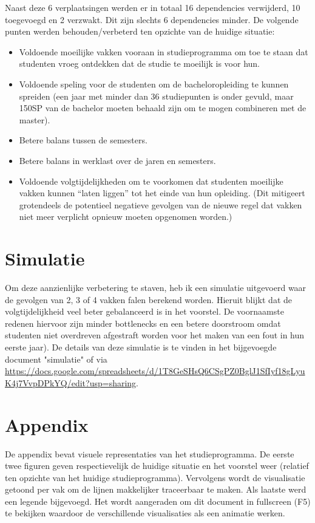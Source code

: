 \documentclass[a4paper]{article}
\begin{document}
    Naast deze 6 verplaatsingen werden er in totaal 16 dependencies verwijderd, 10 toegevoegd en 2 verzwakt. Dit zijn slechts 6 dependencies minder. De volgende punten werden behouden/verbeterd ten opzichte van de huidige situatie:
    \begin{itemize}
        \item Voldoende moeilijke vakken vooraan in studieprogramma om toe te staan dat studenten vroeg ontdekken dat de studie te moeilijk is voor hun.
        \item Voldoende speling voor de studenten om de bacheloropleiding te kunnen spreiden (een jaar met minder dan 36 studiepunten is onder gevuld, maar 150SP van de bachelor moeten behaald zijn om te mogen combineren met de master).
        \item Betere balans tussen de semesters.
        \item Betere balans in werklast over de jaren en semesters.
        \item Voldoende volgtijdelijkheden om te voorkomen dat studenten moeilijke vakken kunnen “laten liggen” tot het einde van hun opleiding. (Dit mitigeert grotendeels de potentieel negatieve gevolgen van de nieuwe regel dat vakken niet meer verplicht opnieuw moeten opgenomen worden.)
    \end{itemize}

    \section{Simulatie}
    \label{sec:simulatie}

    Om deze aanzienlijke verbetering te staven, heb ik een simulatie uitgevoerd waar de gevolgen van 2, 3 of 4 vakken falen berekend worden. Hieruit blijkt dat de volgtijdelijkheid veel beter gebalanceerd is in het voorstel. De voornaamste redenen hiervoor zijn minder bottlenecks en een betere doorstroom omdat studenten niet overdreven afgestraft worden voor het maken van een fout in hun eerste jaar). De details van deze simulatie is te vinden in het bijgevoegde document "simulatie" of via \url{https://docs.google.com/spreadsheets/d/1T8GeSHsQ6CSgPZ0BglJ1SfIyf18gLyuK4j7VvpDPkYQ/edit?usp=sharing}.

    \appendix
    \section{Appendix}
    \label{sec:appenix}

    De appendix bevat visuele representaties van het studieprogramma. De eerste twee figuren geven respectievelijk de huidige situatie en het voorstel weer (relatief ten opzichte van het huidige studieprogramma). Vervolgens wordt de visualisatie getoond per vak om de lijnen makkelijker traceerbaar te maken. Als laatste werd een legende bijgevoegd. Het wordt aangeraden om dit document in fullscreen (F5) te bekijken waardoor de verschillende visualisaties als een animatie werken.
\end{document}
